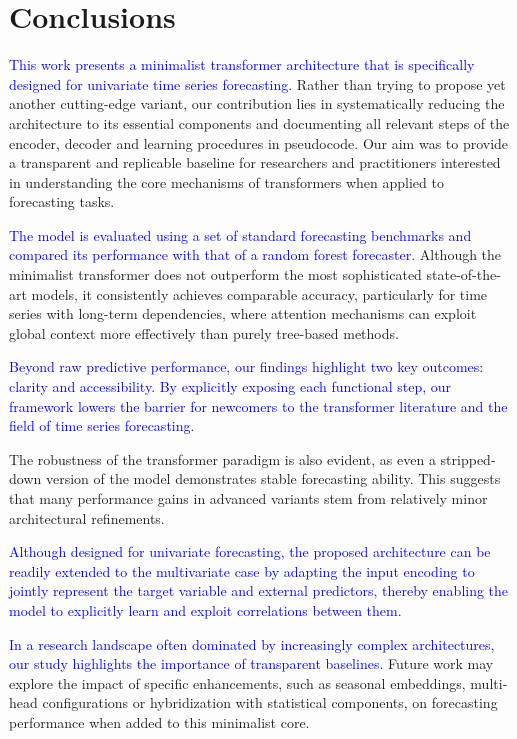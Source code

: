 \documentclass[algorithms,article,submit,pdftex,moreauthors]{Definitions/mdpi}
\begin{document}
\section{Conclusions} \label{sec:conclusions}

\textcolor{blue}{This work presents a minimalist transformer architecture that is specifically designed for univariate time series forecasting}. Rather than trying to propose yet another cutting-edge variant, our contribution lies in systematically reducing the architecture to its essential components and documenting all relevant steps of the encoder, decoder and learning procedures in pseudocode. Our aim was to provide a transparent and replicable baseline for researchers and practitioners interested in understanding the core mechanisms of transformers when applied to forecasting tasks.

\textcolor{blue}{The model is evaluated using a set of standard forecasting benchmarks and compared its performance with that of a random forest forecaster}. Although the minimalist transformer does not outperform the most sophisticated state-of-the-art models, it consistently achieves comparable accuracy, particularly for time series with long-term dependencies, where attention mechanisms can exploit global context more effectively than purely tree-based methods.

\textcolor{blue}{Beyond raw predictive performance, our findings highlight two key outcomes: clarity and accessibility. By explicitly exposing each functional step, our framework lowers the barrier for newcomers to the transformer literature and the field of time series forecasting}.

The robustness of the transformer paradigm is also evident, as even a stripped-down version of the model demonstrates stable forecasting ability. This suggests that many performance gains in advanced variants stem from relatively minor architectural refinements.

\textcolor{blue}{Although designed for univariate forecasting, the proposed architecture can be readily extended to the multivariate case by adapting the input encoding to jointly represent the target variable and external predictors, thereby enabling the model to explicitly learn and exploit correlations between them}.

\textcolor{blue}{In a research landscape often dominated by increasingly complex architectures, our study highlights the importance of transparent baselines}. Future work may explore the impact of specific enhancements, such as seasonal embeddings, multi-head configurations or hybridization with statistical components, on forecasting performance when added to this minimalist core.
\end{document}
